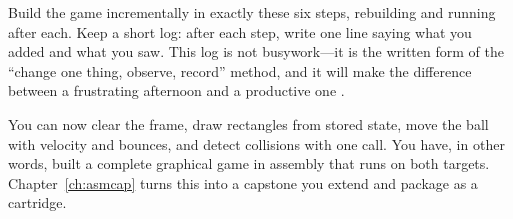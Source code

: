 \begin{prgtry}
Build the game incrementally in exactly these six steps, rebuilding and running
after each. Keep a short log: after each step, write one line saying what you
added and what you saw. This log is not busywork---it is the written form of the
``change one thing, observe, record'' method, and it will make the difference
between a frustrating afternoon and a productive one
\citep{prg32repo}.
\end{prgtry}

\begin{prgcheck}
You can now clear the frame, draw rectangles from stored state, move the ball
with velocity and bounces, and detect collisions with one call. You have, in
other words, built a complete graphical game in \riscv assembly that runs on both
targets. Chapter~\ref{ch:asmcap} turns this into a capstone you extend and
package as a cartridge.
\end{prgcheck}
